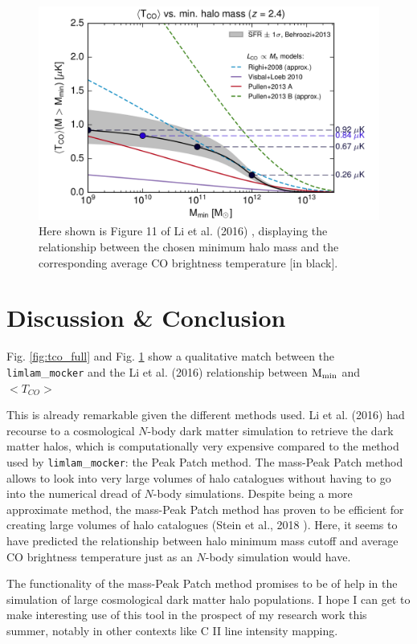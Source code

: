 \documentclass[apj]{emulateapj}
\begin{document}
\begin{figure}[h!]
  \centering
  \includegraphics[width=\linewidth]{li_fig11.png}
  \caption{Here shown is Figure 11 of Li et al. (2016) \cite{Li_2016}, displaying the relationship between the chosen minimum halo mass and the corresponding average CO brightness temperature [in black].}
  \label{fig:tco_li}
\end{figure}

\section{Discussion \& Conclusion}
Fig. \ref{fig:tco_full} and Fig. \ref{fig:tco_li} show a qualitative match between the \texttt{limlam}\_\texttt{mocker} and the Li et al. (2016) \cite{Li_2016} relationship between $\rm{M_{min}}$ and $<T_{CO}>$


This is already remarkable given the different methods used. Li et al. (2016) \cite{Li_2016} had recourse to a cosmological $N$-body dark matter simulation to retrieve the dark matter halos, which is computationally very expensive compared to the method used by \texttt{limlam}\_\texttt{mocker}: the Peak Patch method. The mass-Peak Patch method allows to look into very large volumes of halo catalogues without having to go into the numerical dread of $N$-body simulations. Despite being a more approximate method, the mass-Peak Patch method has proven to be efficient for creating large volumes of halo catalogues (Stein et al., 2018 \cite{Stein_2018}). Here, it seems to have predicted the relationship between halo minimum mass cutoff and average CO brightness temperature just as an $N$-body simulation would have.

The functionality of the mass-Peak Patch method promises to be of help in the simulation of large cosmological dark matter halo populations. I hope I can get to make interesting use of this tool in the prospect of my research work this summer, notably in other contexts like C II line intensity mapping.

\printbibliography
\end{document}
